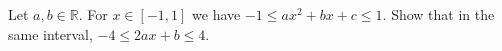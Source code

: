 Let $a, b \in \mathbb{R}$. For $x \in [-1, 1]$ we have $-1 \leq ax^2 + bx + c \leq 1$. Show that in the same interval, $-4 \leq 2ax + b \leq 4$.
